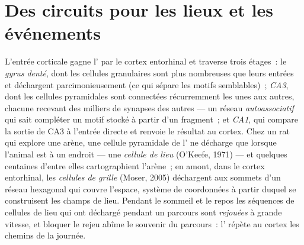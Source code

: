 \section{Des circuits pour les lieux et les événements}

\begin{definition}\label{def:b3:learning-memory:hippocampus}
L'entrée corticale gagne l' par le cortex entorhinal et
traverse trois étages~: le \emph{gyrus denté}, dont les cellules
granulaires sont plus nombreuses que leurs entrées et déchargent
parcimonieusement (ce qui sépare les motifs semblables)~; \emph{CA3},
dont les cellules pyramidales sont connectées récurremment les unes aux
autres, chacune recevant des milliers de synapses des autres --- un
réseau \emph{autoassociatif} qui sait compléter un motif stocké à partir
d'un fragment~; et \emph{CA1}, qui compare la sortie de CA3 à l'entrée
directe et renvoie le résultat au cortex. Chez un rat qui explore une
arène, une cellule pyramidale de l' ne décharge que lorsque
l'animal est à un endroit --- une \emph{cellule de lieu} (O'Keefe, 1971)
--- et quelques centaines d'entre elles cartographient l'arène~; en
amont, dans le cortex entorhinal, les \emph{cellules de grille} (Moser,
2005) déchargent aux sommets d'un réseau hexagonal qui couvre l'espace,
système de coordonnées à partir duquel se construisent les champs de
lieu. Pendant le sommeil et le repos les séquences de cellules de lieu
qui ont déchargé pendant un parcours sont \emph{rejouées} à grande
vitesse, et bloquer le rejeu abîme le souvenir du parcours~: l'
répète au cortex les chemins de la journée.
\end{definition}

